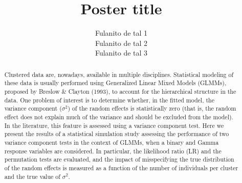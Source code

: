 \documentclass{sciposter}
\title{\textcolor{titlecolor}{Poster title}}
\author{Fulanito de tal 1\\
         Fulanito de tal 2\\
         Fulanito de tal 3}
\institute{Universidad Nacional de Colombia\\
			Universidad Pontificia Bolivariana\\
			Universidad del Norte}
\begin{document}
\begin{boldmath}

\maketitle

\begin{multicols}{3}

\begin{abstract}
Clustered data are, nowadays, available in multiple disciplines. Statistical modeling of these data is usually performed using Generalized Linear Mixed Models (GLMMs), proposed by Breslow \& Clayton (1993), to account for the  hierarchical structure in the data. One problem of interest is to determine whether, in the fitted model, the variance component ($\sigma^2$) of the random effects is statistically zero (that is, the random effect does not explain much of the variance and should be excluded from the model). In the literature, this feature is assessed using a variance component test. Here we present the results of a statistical simulation study assessing the performance of two variance component tests in the context of GLMMs, when a binary and Gamma response variables are considered. In particular, the likelihood ratio (LR) and the permutation tests are evaluated, and the impact of misspecifying the true distribution of the random effects is measured as a function of the number of individuals per cluster and the true value of $\sigma^2$.
\end{abstract}

\end{multicols}
\end{boldmath}
\end{document}
